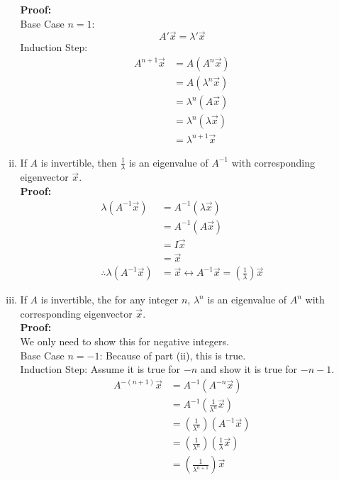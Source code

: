 \documentclass{math}
\begin{document}
\begin{enumerate}[Theorem 1.]
\begin{enumerate}[(i)]
    \textbf{Proof:} \\
    Base Case \( n = 1 \): \\
    \[ A'\vec{x} = \lambda'\vec{x} \]
    Induction Step:
    \begin{align*}
      A^{n+1}\vec{x} &= A(A^n\vec{x}) \\
      &= A(\lambda^n\vec{x}) \\
      &= \lambda^n(A\vec{x}) \\
      &= \lambda^n(\lambda\vec{x}) \\
      &= \lambda^{n+1}\vec{x}
    \end{align*}
    \item If \( A \) is invertible, then \( \frac{1}{\lambda} \) is an
    eigenvalue of \( A^{-1} \) with corresponding eigenvector \( \vec{x} \). \\
    \textbf{Proof:}
    \begin{align*}
      \lambda(A^{-1}\vec{x}) &= A^{-1}(\lambda\vec{x}) \\
      &= A^{-1}(A\vec{x}) \\
      &= I\vec{x} \\
      &= \vec{x} \\
      \therefore \lambda(A^{-1}\vec{x}) &= \vec{x} \leftrightarrow
        A^{-1}\vec{x} = (\frac{1}{\lambda})\vec{x}
    \end{align*}
    \item If \( A \) is invertible, the for any integer \( n \), \( \lambda^n \)
    is an eigenvalue of \( A^n \) with corresponding eigenvector
    \( \vec{x} \). \\
    \textbf{Proof:} \\
    We only need to show this for negative integers. \\
    Base Case \( n = -1 \): Because of part (ii), this is true. \\
    Induction Step: Assume it is true for \( -n \) and show it is true for
    \( -n-1 \).
    \begin{align*}
      A^{-(n+1)}\vec{x} &= A^{-1}(A^{-n}\vec{x}) \\
      &= A^{-1}(\frac{1}{\lambda^n}\vec{x}) \\
      &= (\frac{1}{\lambda^n})(A^{-1}\vec{x}) \\
      &= (\frac{1}{\lambda^n})(\frac{1}{\lambda}\vec{x}) \\
      &= (\frac{1}{\lambda^{n+1}})\vec{x}
    \end{align*}
  \end{enumerate}

\end{enumerate}
\end{document}
